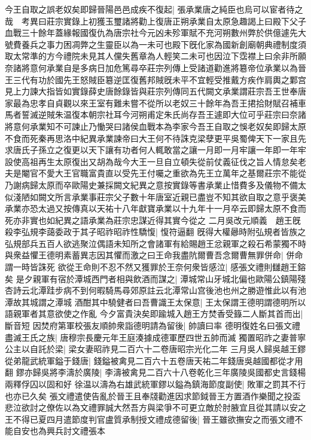 今王自取之誤老奴矣即歸晉陽邑邑成疾不復起|{
	張承業唐之純臣也烏可以宦者待之哉　考異曰莊宗實錄上初獲玉璽諸將勸上復唐正朔承業自太原急趣謁上曰殿下父子血戰三十餘年蓋緣報國復仇為唐宗社今元凶未殄軍賦不充河朔數州弊於供億遽先大號費養兵之事力困凋弊之生靈臣以為一未可也殿下旣化家為國新創廟朝典禮制度須取太常準的方今禮院未見其人儻失舊章為人輕笑二未可也因泣下霑襟上曰余非所願奈諸將意何承業自是多病日加危篤尋卒莊宗列傳上受諸道勸進將簒帝位承業以為晉王三代有功於國先王怒賊臣簒逆匡復舊邦賊旣未平不宜輕受推戴方疾作肩輿之鄴宫見上力諫大指皆如實錄薛史唐餘錄皆與莊宗列傳同五代闕文承業謂莊宗吾王世奉唐家最為忠孝自貞觀以來王室有難未嘗不從所以老奴三十餘年為吾王捃拾財賦召補車馬者誓滅逆賊朱温復本朝宗社耳今河朔甫定朱氏尚存吾王遽即大位可乎莊宗曰奈諸將意何承業知不可諫止乃慟哭曰諸侯血戰本為李家今吾王自取之悞老奴矣即歸太原不食而死秦再思洛中紀異承業諫帝曰大王何不待誅克梁孽更平吳蜀俾天下一家且先求唐氏子孫立之復更以天下讓有功者何人輒敢當之讓一月即一月牢讓一年即一年牢設使高祖再生太原復出又胡為哉今大王一旦自立頓失從前仗義征伐之旨人情怠矣老夫是閹官不愛大王官職富貴直以受先王付囑之重欲為先王立萬年之基爾莊宗不能從乃謝病歸太原而卒歐陽史兼採闕文紀異之意按實錄等書承業止惜費多及儀物不備太似淺陋如闕文所言承業事莊宗父子數十年唐室近親已盡豈不知其欲自取之意乎褒美承業亦恐太過又按傳真以天祐十八年獻寶承業以十九年十一月卒云即歸太原不食而死亦非實也如紀異之語承業為莊宗忠謀近得其實今從之}
二月吳改元順義　趙王旣殺李弘規李藹委政于其子昭祚昭祚性驕愎|{
	愎符逼翻}
旣得大權曏時附弘規者皆族之弘規部兵五百人欲逃聚泣偶語未知所之會諸軍有給賜趙王忿親軍之殺石希蒙獨不時與衆益懼王德明素蓄異志因其懼而激之曰王命我盡阬爾曹吾念爾曹無罪併命|{
	併命謂一時皆誅死}
欲從王命則不忍不然又獲罪於王奈何衆皆感泣|{
	感張文禮則讎趙王鎔矣}
是夕親軍有宿於潭城西門者相與飲酒而謀之|{
	潭城常山牙城北偏也歐陽公鎮陽殘杏詩云北潭跬步病不到何暇騎馬尋郊原註云北潭常山宫後池也州之勝遊惟此以有池潭故其城謂之潭城}
酒酣其中驍健者曰吾曹識王太保意|{
	王太保謂王德明謂德明所以語親軍者其意欲使之作亂}
今夕富貴決矣即踰城入趙王方焚香受籙二人斷其首而出|{
	斷音短}
因焚府第軍校張友順帥衆詣德明請為留後|{
	帥讀曰率}
德明復姓名曰張文禮盡滅王氏之族|{
	唐穆宗長慶元年王庭湊據成德軍歷四世五帥而滅}
獨置昭祚之妻普寧公主以自託於梁|{
	梁女妻昭祚見二百六十二卷唐昭宗光化二年}
三月吳人歸吳越王鏐從弟龍武統軍鎰于錢唐|{
	錢鎰被禽見二百六十五卷唐天祐二年錢唐吳越國都從才用翻}
鏐亦歸吳將李濤於廣陵|{
	李濤被禽見二百六十八卷乾化三年廣陵吳國都史言錢楊兩釋俘囚以固和好}
徐温以濤為右雄武統軍鏐以鎰為鎮海節度副使|{
	敗軍之罰其不行也亦已久矣}
張文禮遣使告亂於晉王且奉牋勸進因求節鉞晉王方置酒作樂聞之投盃悲泣欲討之僚佐以為文禮罪誠大然吾方與梁爭不可更立敵於肘腋宜且從其請以安之王不得已夏四月遣節度判官盧質承制授文禮成德留後|{
	晉王雖欲撫安之而張文禮不能自安也為興兵討文禮張本}
